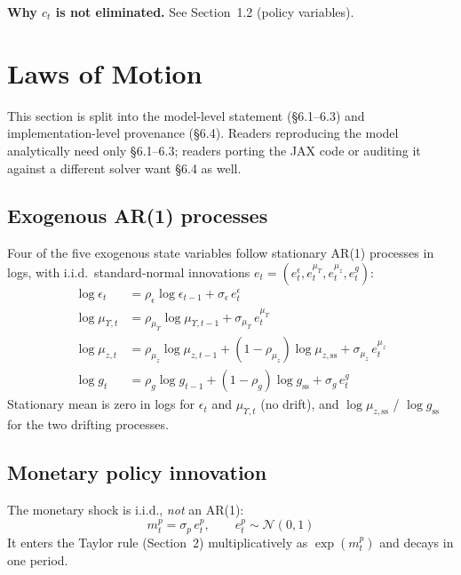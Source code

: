 \documentclass[11pt]{article}
\begin{document}
\noindent\textbf{Why $c_t$ is not eliminated.}\;
See Section~1.2 (policy variables).


\section{Laws of Motion}

This section is split into the model-level statement (\S6.1--6.3) and
implementation-level provenance (\S6.4). Readers reproducing the model
analytically need only \S6.1--6.3; readers porting the JAX code or
auditing it against a different solver want \S6.4 as well.

\subsection{Exogenous AR(1) processes}

Four of the five exogenous state variables follow stationary AR(1) processes
in logs, with i.i.d.\ standard-normal innovations
$e_t = (e_t^\epsilon, e_t^{\mu_\Upsilon}, e_t^{\mu_z}, e_t^g)$:
\begin{align*}
  \log\epsilon_t &= \rho_\epsilon \log\epsilon_{t-1}
    + \sigma_\epsilon\,e_t^\epsilon
  \\
  \log\mu_{\Upsilon,t} &= \rho_{\mu_\Upsilon} \log\mu_{\Upsilon,t-1}
    + \sigma_{\mu_\Upsilon}\,e_t^{\mu_\Upsilon}
  \\
  \log\mu_{z,t} &= \rho_{\mu_z} \log\mu_{z,t-1}
    + (1-\rho_{\mu_z})\log\mu_{z,\text{ss}}
    + \sigma_{\mu_z}\,e_t^{\mu_z}
  \\
  \log g_t &= \rho_g \log g_{t-1} + (1-\rho_g)\log g_{\text{ss}}
    + \sigma_g\,e_t^g
\end{align*}
Stationary mean is zero in logs for $\epsilon_t$ and $\mu_{\Upsilon,t}$
(no drift), and $\log\mu_{z,\text{ss}}$ / $\log g_{\text{ss}}$ for the
two drifting processes.

\subsection{Monetary policy innovation}

The monetary shock is i.i.d., \emph{not} an AR(1):
\begin{equation*}
  m_t^p = \sigma_p\,e_t^p, \qquad e_t^p \sim \mathcal{N}(0,1)
\end{equation*}
It enters the Taylor rule (Section~2) multiplicatively as $\exp(m_t^p)$
and decays in one period.
\end{document}
